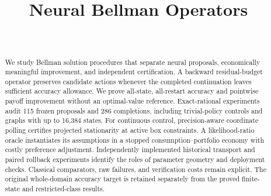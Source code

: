

\begin{frontmatter}
\title{Neural Bellman Operators}
\begin{aug}\author[id=au1,addressref={add1}]{~}\address[id=add1]{}\end{aug}
\begin{abstract}We study Bellman solution procedures that separate neural proposals, economically meaningful improvement, and independent certification. A backward residual-budget operator preserves candidate actions whenever the completed continuation leaves sufficient accuracy allowance. We prove all-state, all-restart accuracy and pointwise payoff improvement without an optimal-value reference. Exact-rational experiments audit 115 frozen proposals and 286 completions, including trivial-policy controls and graphs with up to 16,384 states. For continuous control, precision-aware coordinate polling certifies projected stationarity at active box constraints. A likelihood-ratio oracle instantiates its assumptions in a stopped consumption--portfolio economy with costly preference adjustment. Independently implemented historical transport and paired rollback experiments identify the roles of parameter geometry and deployment checks. Classical comparators, raw failures, and verification costs remain explicit. The original whole-domain accuracy target is retained separately from the proved finite-state and restricted-class results.\end{abstract}
\begin{keyword}\end{keyword}
\end{frontmatter}







